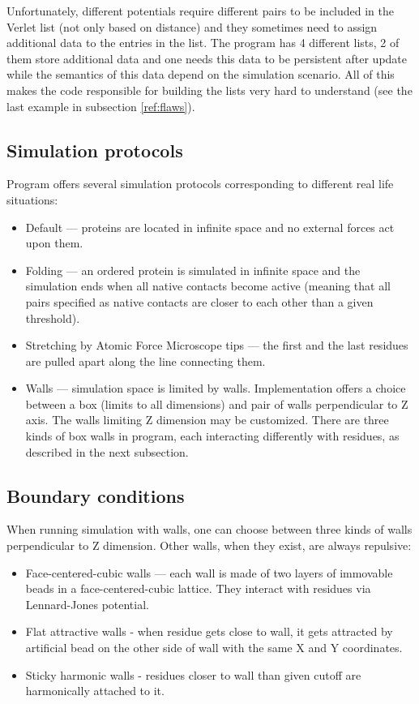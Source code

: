 Unfortunately, different potentials require different pairs to be included in the Verlet list (not only based on distance) and they sometimes need to assign additional data to the entries in the list. The program has 4 different lists, 2 of them store additional data and one needs this data to be persistent after update while the semantics of this data depend on the simulation scenario. All of this makes the code responsible for building the lists very hard to understand (see the last example in subsection \ref{ref:flaws}). 

\subsection {Simulation protocols}
Program offers several simulation protocols corresponding to different real life situations:
\begin{itemize}
    \item Default --- proteins are located in infinite space and no external forces act upon them.
    \item Folding --- an ordered protein is simulated in infinite space and the simulation ends when all native contacts become active (meaning that all pairs specified as native contacts are closer to each other than a given threshold).
    \item Stretching by Atomic Force Microscope tips --- the first and the last residues are pulled apart along the line connecting them.
    \item Walls --- simulation space is limited by walls. Implementation offers a choice between a box (limits to all dimensions) and pair of walls perpendicular to Z axis. The walls limiting Z dimension may be customized. There are three kinds of box walls in program, each interacting differently with residues, as described in the next subsection.
    
\end{itemize}

\subsection {Boundary conditions}\label{ref:boundary}
When running simulation with walls, one can choose between three kinds of walls perpendicular to Z dimension. Other walls, when they exist, are always repulsive:
\begin{itemize}
    \item Face-centered-cubic walls --- each wall is made of two layers of immovable beads in a face-centered-cubic lattice. They interact with residues via Lennard-Jones potential.
    \item Flat attractive walls - when residue gets close to wall, it gets attracted by artificial bead on the other side of wall with the same X and Y coordinates.
    \item Sticky harmonic walls - residues closer to wall than given cutoff are harmonically attached to it.
\end{itemize}

